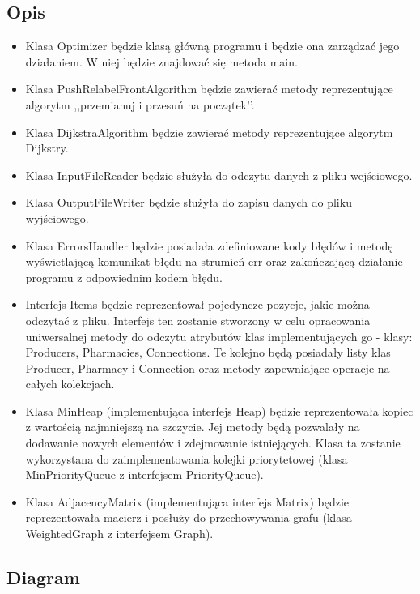 \documentclass{article}
\begin{document}
    \subsection{Opis}
    {\fontsize{13}{13}\selectfont
        \begin{itemize}
            \item Klasa Optimizer będzie klasą główną programu i będzie ona zarządzać jego działaniem. W niej będzie znajdować się metoda main.
            \item Klasa PushRelabelFrontAlgorithm będzie zawierać metody reprezentujące algorytm ,,przemianuj i przesuń na początek’’.
            \item Klasa DijkstraAlgorithm będzie zawierać metody reprezentujące algorytm Dijkstry.
            \item Klasa InputFileReader będzie służyła do odczytu danych z pliku wejściowego.
            \item Klasa OutputFileWriter będzie służyła do zapisu danych do pliku wyjściowego.
            \item Klasa ErrorsHandler będzie posiadała zdefiniowane kody błędów i metodę wyświetlającą komunikat błędu na strumień err oraz zakończającą działanie programu z odpowiednim kodem błędu.
            \item 	Interfejs  Items będzie reprezentował pojedyncze pozycje, jakie można odczytać z pliku. Interfejs ten zostanie stworzony w celu opracowania uniwersalnej metody do odczytu atrybutów klas implementujących go - klasy: Producers, Pharmacies, Connections. Te kolejno będą posiadały listy klas Producer, Pharmacy i Connection oraz metody zapewniające operacje na całych kolekcjach.
            \item Klasa MinHeap (implementująca interfejs Heap) będzie reprezentowała kopiec z wartością najmniejszą na szczycie. Jej metody będą pozwalały na dodawanie nowych elementów i zdejmowanie istniejących. Klasa ta zostanie wykorzystana do zaimplementowania kolejki priorytetowej (klasa MinPriorityQueue z interfejsem PriorityQueue).
            \item Klasa AdjacencyMatrix (implementująca interfejs Matrix) będzie reprezentowała macierz i posłuży do przechowywania grafu (klasa WeightedGraph z interfejsem Graph).
    
        \end{itemize}
    \newpage
    \subsection{Diagram}
    

}
\end{document}
